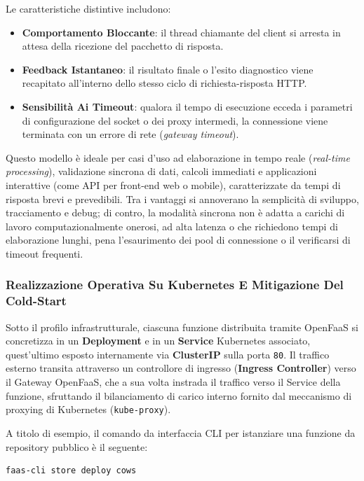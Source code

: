 \documentclass[11pt, a4paper]{article}
\begin{document}
Le caratteristiche distintive includono:
\begin{itemize}
    \item \textbf{Comportamento Bloccante}: il thread chiamante del client si arresta in attesa della ricezione del pacchetto di risposta.
    \item \textbf{Feedback Istantaneo}: il risultato finale o l'esito diagnostico viene recapitato all'interno dello stesso ciclo di richiesta-risposta HTTP.
    \item \textbf{Sensibilità Ai Timeout}: qualora il tempo di esecuzione ecceda i parametri di configurazione del socket o dei proxy intermedi, la connessione viene terminata con un errore di rete (\emph{gateway timeout}).
\end{itemize}

Questo modello è ideale per casi d'uso ad elaborazione in tempo reale (\emph{real-time processing}), validazione sincrona di dati, calcoli immediati e applicazioni interattive (come API per front-end web o mobile), caratterizzate da tempi di risposta brevi e prevedibili. Tra i vantaggi si annoverano la semplicità di sviluppo, tracciamento e debug; di contro, la modalità sincrona non è adatta a carichi di lavoro computazionalmente onerosi, ad alta latenza o che richiedono tempi di elaborazione lunghi, pena l'esaurimento dei pool di connessione o il verificarsi di timeout frequenti.


\subsubsection{Realizzazione Operativa Su Kubernetes E Mitigazione Del Cold-Start}

Sotto il profilo infrastrutturale, ciascuna funzione distribuita tramite OpenFaaS si concretizza in un \textbf{Deployment} e in un \textbf{Service} Kubernetes associato, quest'ultimo esposto internamente via \textbf{ClusterIP} sulla porta \texttt{80}. Il traffico esterno transita attraverso un controllore di ingresso (\textbf{Ingress Controller}) verso il Gateway OpenFaaS, che a sua volta instrada il traffico verso il Service della funzione, sfruttando il bilanciamento di carico interno fornito dal meccanismo di proxying di Kubernetes (\texttt{kube-proxy}).

A titolo di esempio, il comando da interfaccia CLI per istanziare una funzione da repository pubblico è il seguente:
\begin{lstlisting}[language=bash]
faas-cli store deploy cows
\end{lstlisting}
\end{document}
